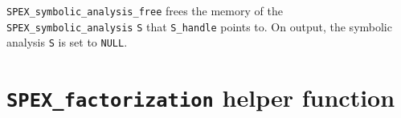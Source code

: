 \documentclass[12pt,oneside]{book}
\theoremstyle{definition}
\begin{document}
\verb|SPEX_symbolic_analysis_free| frees the memory of the \verb|SPEX_symbolic_analysis| \verb|S| that \verb|S_handle| points to. On output, the symbolic analysis \verb|S| is set to \verb|NULL|.


\section{\texttt{SPEX\_factorization} helper function} \label{s:spex_factorization_helper}
\end{document}
